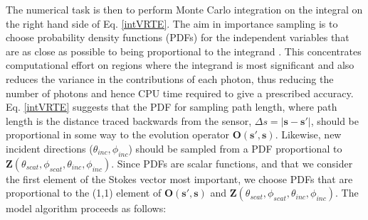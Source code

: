 The numerical task is then to perform Monte Carlo
integration on the integral on the right hand side of
Eq. \ref{intVRTE}.
The aim in importance sampling is to choose probability density functions
(PDFs) for the independent variables that are
as close as possible to being proportional to the integrand
\cite{liu01}. This concentrates computational effort on regions where
the integrand is most significant and also reduces the variance in the contributions of each photon, thus reducing
the number of photons and hence CPU time required to give a
prescribed accuracy.  Eq. \ref{intVRTE} suggests that the PDF for
sampling path length, where path length is the distance traced backwards
from the sensor, $\Delta s=\left|\mathbf{s}-\mathbf{s'}\right|$, should be proportional in some way to the evolution
operator $\mathbf{O(s',s)}$. Likewise, new incident directions
($\theta_{inc},\phi_{inc}$) should be sampled from a PDF proportional
to
$\mathbf{Z}(\theta_{scat},\phi_{scat},\theta_{inc},\phi_{inc})$.
Since PDFs are scalar functions, and that we consider the first element of the
Stokes vector most important, we choose PDFs that are proportional to the
(1,1) element of $\mathbf{O(s',s)}$ and $\mathbf{Z}(\theta_{scat},\phi_{scat},\theta_{inc},\phi_{inc})$. 
 \label{sec:montecarlo:alg}
The model algorithm proceeds as follows:


